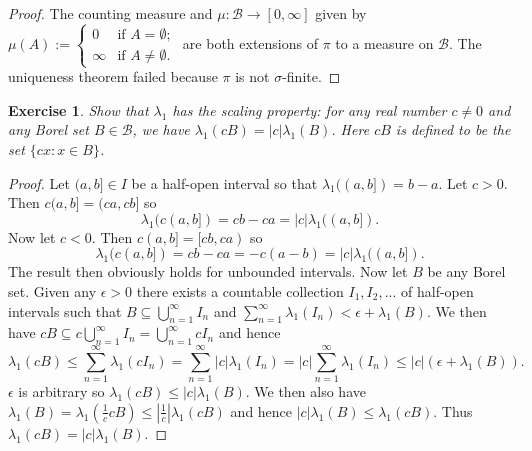 \documentclass{article}
\newtheorem{exercise}[theorem]{Exercise}
\begin{document}
\begin{proof}
The counting measure and $\mu:\mathcal{B}\to[0,\infty]$ given by $\mu(A) :=
    \begin{cases}
        0 & \text{if } A = \emptyset; \\
        \infty & \text{if } A \neq \emptyset.
    \end{cases}$ are both extensions of $\pi$ to a measure on $\mathcal{B}$. The uniqueness theorem failed because $\pi$ is not $\sigma$-finite.
\end{proof}
\begin{exercise}
Show that $\lambda_1$ has the scaling property: for any real number $c \neq 0$ and any Borel set $B \in \mathcal{B}$, we have $\lambda_1(cB) = |c| \lambda_1(B)$. Here $cB$ is defined to be the set $\{cx : x \in B\}$.
\end{exercise}
\begin{proof}
Let $(a,b]\in I$ be a half-open interval so that $\lambda_1((a,b])=b-a$. Let $c>0$. Then $c(a,b]=(ca,cb]$ so \[\lambda_1(c(a,b])=cb-ca=|c|\lambda_1((a,b]).\] Now let $c<0$. Then $c(a,b]=[cb,ca)$ so \[\lambda_1(c(a,b])=cb-ca=-c(a-b)=|c|\lambda_1((a,b]).\] The result then obviously holds for unbounded intervals. Now let $B$ be any Borel set. Given any $\epsilon>0$ there exists a countable collection $I_1,I_2,...$ of half-open intervals such that $B\subseteq\bigcup_{n=1}^\infty I_n$ and $\sum_{n=1}^\infty\lambda_1(I_n)<\epsilon+\lambda_1(B)$. We then have $cB\subseteq c\bigcup_{n=1}^\infty I_n=\bigcup_{n=1}^\infty cI_n$ and hence \[\lambda_1(cB)\leq\sum_{n=1}^\infty\lambda_1(cI_n)=\sum_{n=1}^\infty|c|\lambda_1(I_n)=|c|\sum_{n=1}^\infty\lambda_1(I_n)\leq|c|(\epsilon+\lambda_1(B)).\] $\epsilon$ is arbitrary so $\lambda_1(cB)\leq|c|\lambda_1(B)$. We then also have $\lambda_1(B)=\lambda_1(\frac{1}{c}cB)\leq|\frac{1}{c}|\lambda_1(cB)$ and hence $|c|\lambda_1(B)\leq\lambda_1(cB)$. Thus $\lambda_1(cB)=|c|\lambda_1(B)$.
\end{proof}
\end{document}
